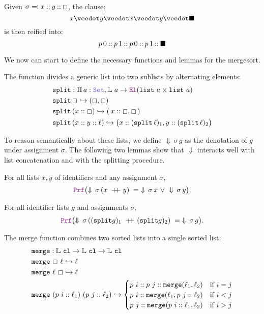 \begin{example}[Reification]
Given $\sigma \eqcolon x \mathbin{::} y \mathbin{::} \Box$, the clause:
\[
    x \veedot y \veedot x \veedot y \veedot \nil 
\]
is then reified into:
\[
    p\,0 \mathbin{::} p\,1 \mathbin{::} p\,0 \mathbin{::} p\,1 \mathbin{::} \blacksquare
\]
\end{example}

We now can start to define the necessary functions and lemmas for the mergesort.

\begin{definition}[split]
The function  divides a generic list into two sublists by alternating elements:
\begin{align*}
&\kw{split}: \Pi\,a:\set, \bb{L}~a \ra \el (\kw{list}~a \times \kw{list}~a)\\
&\kw{split}\,\Box \re (\Box , \Box) \\
&\kw{split}\,(x::\Box) \re (\,x::\Box , \Box\,) \\
&\kw{split}\,(x::y::\ell) \re \bigl(x::(\kw{split}\,\ell)_1, y::(\kw{split}\,\ell)_2 \bigr)
\end{align*}
\end{definition}

To reason semantically about these lists, we define $\Downarrow\,\sigma\,g$ as the denotation of $g$ under assignment $\sigma$.  
The following two lemmas show that $\Downarrow$ interacts well with list concatenation and with the splitting procedure.


\begin{lemma}\label{lem:den-cat}
For all lists \(x,y\) of identifiers and any assignment \(\sigma\),
\[
\prf\bigl(\Downarrow\,\sigma\,(x \concat y) \;=\; \Downarrow\,\sigma\,x \ \vee\ \Downarrow\,\sigma\,y\bigr).
\]
\end{lemma}

\begin{lemma}\label{lem:split-correct}
For all identifier lists \(g\) and assignments \(\sigma\),
\[
  \prf\bigl(\Downarrow\,\sigma\,((\kw{split} g)_1 \concat (\kw{split} g)_2) \;=\; \Downarrow\,\sigma\,g\bigr).
\]
\end{lemma}

\begin{definition}[merge]
The merge function combines two sorted lists into a single sorted list:
\begin{align*}
& \texttt{\upshape{merge}}: \mathbb{L}~\texttt{\upshape{cl}} \rightarrow \mathbb{L}~\texttt{\upshape{cl}} \rightarrow \mathbb{L}~\texttt{\upshape{cl}} \\
&\texttt{\upshape{merge}}~\Box~\ell \hookrightarrow \ell \\
&\texttt{\upshape{merge}}~\ell~\Box \hookrightarrow \ell \\
&\texttt{\upshape{merge}}~(p~i :: \ell_1)~(p~j::\ell_2) \hookrightarrow
\begin{cases}
p~i :: p~j :: \texttt{\upshape{merge}}(\ell_1,\ell_2) & \text{if } i = j \\
p~i :: \texttt{\upshape{merge}}(\ell_1, p~j::\ell_2) & \text{if } i < j \\
p~j :: \texttt{\upshape{merge}}(p~i::\ell_1, \ell_2) & \text{if } i > j
\end{cases}
\end{align*}
\end{definition}

